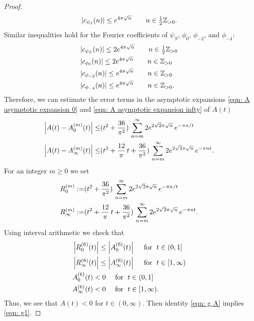 \begin{proof}
  \begin{equation}\label{eqn: Fourier estimate 1}|c_{\psi_I}(n)|\leq e^{4\pi\sqrt{n}}\qquad n\in\tfrac 12 \mathbb{Z}_{>0}.\end{equation} Similar inequalities hold for the Fourier coefficients of $\psi_S$, $\phi_0$, $\phi_{-2}$, and $\phi_{-4}$:
  \begin{align}\label{eqn: Fourier estimate 2}
  &|c_{\psi_S}(n)|\leq 2e^{4\pi\sqrt{n}}\qquad n\in\tfrac 12 \mathbb{Z}_{>0} \\
  &|c_{\phi_0}(n)|\leq 2e^{4\pi\sqrt{n}}\qquad n\in \mathbb{Z}_{>0} \\
  &|c_{\phi_{-2}}(n)|\leq e^{4\pi\sqrt{n}}\qquad n\in  \mathbb{Z}_{>0} \\
  &|c_{\phi_{-4}}(n)|\leq e^{4\pi\sqrt{n}}\qquad n\in \mathbb{Z}_{>0}. \label{eqn: Fourier estimate 5}
   \end{align}
  Therefore, we can estimate the error terms in the asymptotic expansions \eqref{eqn: A asymptotic expansion 0} and \eqref{eqn: A asymptotic expansion infty} of $A(t)$
  \begin{align}
  \left|A(t)-A_0^{(m)}(t)\right|\leq& (t^2+\frac{36}{\pi^2})\,\sum_{n=m}^\infty 2e^{2\sqrt{2}\pi\sqrt{n}}\,e^{-\pi n/t}\notag\\
  \left|A(t)-A_\infty^{(m)}(t)\right|\leq& (t^2+\frac{12}{\pi}\,t+\frac{36}{\pi^2})\,\sum_{n=m}^\infty 2e^{2\sqrt{2}\pi\sqrt{n}}\,e^{-\pi nt}.\notag
  \end{align}
   For an integer $m\geq0$ we set
  \begin{align}
  R^{(m)}_0:=&(t^2+\frac{36}{\pi^2})\,\sum_{n=m}^\infty 2e^{2\sqrt{2}\pi\sqrt{n}}\,e^{-\pi n/t}\notag\\
  R^{(m)}_\infty:=&(t^2+\frac{12}{\pi}\,t+\frac{36}{\pi^2})\,\sum_{n=m}^\infty 2e^{2\sqrt{2}\pi\sqrt{n}}\,e^{-\pi nt}.\notag
  \end{align}
  Using interval arithmetic we check that
  \begin{align}
  &\left|R_0^{(6)}(t)\right|\leq\left|A_0^{(6)}(t)\right|\quad\mbox{ for }\;t\in(0,1]\notag\\
  &\left|R_\infty^{(6)}(t)\right|\leq\left|A_\infty^{(6)}(t)\right|\quad\mbox{ for }\;t\in[1,\infty)\notag\\
  &A_0^{(6)}(t)<0\quad\mbox{ for }\;t\in(0,1]\notag\\
  &A_\infty^{(6)}(t)<0\quad\mbox{ for }\;t\in[1,\infty).\notag
  \end{align}
  Thus, we see that $A(t)<0$ for $t\in (0,\infty)$. Then identity \eqref{eqn: g A} implies \eqref{eqn: g1}.



\end{proof}
